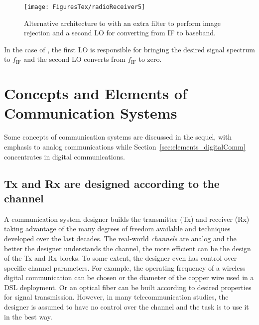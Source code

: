 \begin{figure}[htbp]
	\centering
		\texttt{[image: FiguresTex/radioReceiver5]}		
	\caption{Alternative architecture to  with an extra filter to perform image rejection and a second LO for converting from IF to baseband.\label{fig:radioReceiver5}}
\end{figure}

In the case of , the first LO is responsible for bringing the desired signal spectrum to $f_{\textrm{IF}}$ and the second LO converts from $f_{\textrm{IF}}$ to zero.


\section{Concepts and Elements of Communication Systems}
\label{sec:elements_analogComm}

Some concepts of communication systems are discussed in the sequel, with emphasis
to analog communications while Section~\ref{sec:elements_digitalComm} concentrates
in digital communications.

\subsection{Tx and Rx are designed according to the channel}

A communication system designer builds the transmitter (Tx) and receiver (Rx) taking advantage of the many degrees of freedom available and techniques developed over the last decades. The real-world \emph{channels} are analog and the better the designer understands the channel, the more efficient can be the design of the Tx and Rx blocks. To some extent, the designer even has control over specific channel parameters. For example, the operating frequency of a wireless digital communication can be chosen or the diameter of the copper wire used in a DSL deployment. Or an optical fiber can be built according to desired properties for signal transmission. However, in many telecommunication studies, the designer is assumed to have no control over the channel and the task is to use it in the best way.

